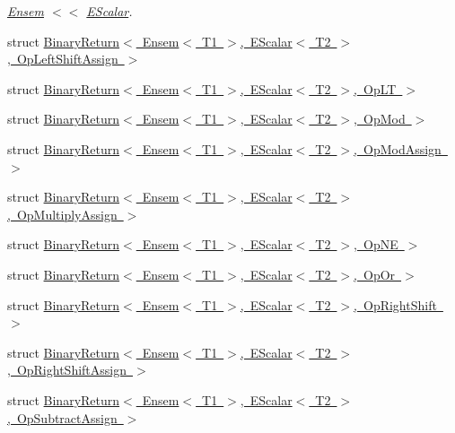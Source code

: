 \begin{DoxyCompactItemize}
\begin{DoxyCompactList}\small\item\em \mbox{\hyperlink{classENSEM_1_1Ensem}{Ensem}} $<$$<$ \mbox{\hyperlink{classENSEM_1_1EScalar}{E\+Scalar}}. \end{DoxyCompactList}\item 
struct \mbox{\hyperlink{structENSEM_1_1BinaryReturn_3_01Ensem_3_01T1_01_4_00_01EScalar_3_01T2_01_4_00_01OpLeftShiftAssign_01_4}{Binary\+Return$<$ Ensem$<$ T1 $>$, E\+Scalar$<$ T2 $>$, Op\+Left\+Shift\+Assign $>$}}
\item 
struct \mbox{\hyperlink{structENSEM_1_1BinaryReturn_3_01Ensem_3_01T1_01_4_00_01EScalar_3_01T2_01_4_00_01OpLT_01_4}{Binary\+Return$<$ Ensem$<$ T1 $>$, E\+Scalar$<$ T2 $>$, Op\+L\+T $>$}}
\item 
struct \mbox{\hyperlink{structENSEM_1_1BinaryReturn_3_01Ensem_3_01T1_01_4_00_01EScalar_3_01T2_01_4_00_01OpMod_01_4}{Binary\+Return$<$ Ensem$<$ T1 $>$, E\+Scalar$<$ T2 $>$, Op\+Mod $>$}}
\item 
struct \mbox{\hyperlink{structENSEM_1_1BinaryReturn_3_01Ensem_3_01T1_01_4_00_01EScalar_3_01T2_01_4_00_01OpModAssign_01_4}{Binary\+Return$<$ Ensem$<$ T1 $>$, E\+Scalar$<$ T2 $>$, Op\+Mod\+Assign $>$}}
\item 
struct \mbox{\hyperlink{structENSEM_1_1BinaryReturn_3_01Ensem_3_01T1_01_4_00_01EScalar_3_01T2_01_4_00_01OpMultiplyAssign_01_4}{Binary\+Return$<$ Ensem$<$ T1 $>$, E\+Scalar$<$ T2 $>$, Op\+Multiply\+Assign $>$}}
\item 
struct \mbox{\hyperlink{structENSEM_1_1BinaryReturn_3_01Ensem_3_01T1_01_4_00_01EScalar_3_01T2_01_4_00_01OpNE_01_4}{Binary\+Return$<$ Ensem$<$ T1 $>$, E\+Scalar$<$ T2 $>$, Op\+N\+E $>$}}
\item 
struct \mbox{\hyperlink{structENSEM_1_1BinaryReturn_3_01Ensem_3_01T1_01_4_00_01EScalar_3_01T2_01_4_00_01OpOr_01_4}{Binary\+Return$<$ Ensem$<$ T1 $>$, E\+Scalar$<$ T2 $>$, Op\+Or $>$}}
\item 
struct \mbox{\hyperlink{structENSEM_1_1BinaryReturn_3_01Ensem_3_01T1_01_4_00_01EScalar_3_01T2_01_4_00_01OpRightShift_01_4}{Binary\+Return$<$ Ensem$<$ T1 $>$, E\+Scalar$<$ T2 $>$, Op\+Right\+Shift $>$}}
\item 
struct \mbox{\hyperlink{structENSEM_1_1BinaryReturn_3_01Ensem_3_01T1_01_4_00_01EScalar_3_01T2_01_4_00_01OpRightShiftAssign_01_4}{Binary\+Return$<$ Ensem$<$ T1 $>$, E\+Scalar$<$ T2 $>$, Op\+Right\+Shift\+Assign $>$}}
\item 
struct \mbox{\hyperlink{structENSEM_1_1BinaryReturn_3_01Ensem_3_01T1_01_4_00_01EScalar_3_01T2_01_4_00_01OpSubtractAssign_01_4}{Binary\+Return$<$ Ensem$<$ T1 $>$, E\+Scalar$<$ T2 $>$, Op\+Subtract\+Assign $>$}}

\end{DoxyCompactItemize}
